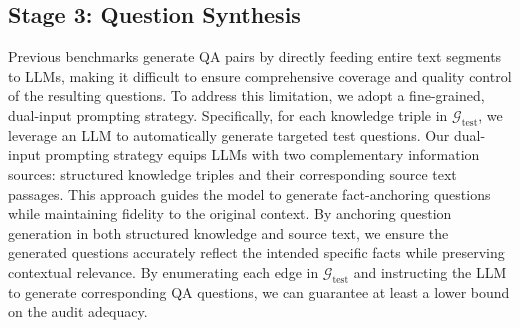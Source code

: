 


\subsection{Stage 3: Question Synthesis}
Previous benchmarks generate QA pairs by directly feeding entire text segments to LLMs, making it difficult to ensure comprehensive coverage and quality control of the resulting questions.  
To address this limitation, we adopt a fine-grained, dual-input prompting strategy. Specifically, for each knowledge triple in \(\mathcal{G}_{\text{test}}\), we leverage an LLM to automatically generate targeted test questions. 
Our dual-input prompting strategy equips LLMs with two complementary information sources: structured knowledge triples and their corresponding source text passages. This approach guides the model to generate fact-anchoring questions while maintaining fidelity to the original context. 
By anchoring question generation in both structured knowledge and source text, we ensure the generated questions accurately reflect the intended specific facts while preserving contextual relevance.
By enumerating each edge in \(\mathcal{G}_{\text{test}}\) and instructing the LLM to generate corresponding QA questions, we can guarantee at least a lower bound on the audit adequacy.

